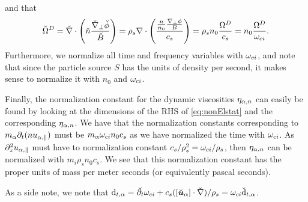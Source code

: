 %
and that
%
\begin{align*}
\breve{\Omega}^D = \breve{\nabla}\cdot\left(\breve{n}\frac{\breve{\nabla}_\perp \breve{\phi}}{\breve{B}}\right)
= \rho_s\nabla\cdot\left(\frac{\frac{n}{n_0}\frac{\nabla_\perp \phi}{B}}{c_s}\right)
= \rho_sn_0\frac{\Omega^D}{c_s}
= n_0\frac{\Omega^D}{\omega_{ci}}.
\end{align*}
%
Furthermore, we normalize all time and frequency variables with $\omega_{ci}$, and note that since the particle source $S$ has the units of density per second, it makes sense to normalize it with $n_0$ and $\omega_{ci}$.

Finally, the normalization constant for the dynamic viscosities $\eta_{\alpha,n}$ can easily be found by looking at the dimensions of the RHS of \cref{eq:nonElstat} and the corresponding $\eta_{\alpha,n}$.
We have that the normalization constants corresponding to $m_\alpha \partial_t(nu_{\alpha,\|})$ must be $m_\alpha\omega_{ci}n_0c_s$ as we have normalized the time with $\omega_{ci}$.
As $\partial_z^2 u_{\alpha,\|}$ must have to normalization constant $c_s/\rho_s^2=\omega_{ci}/\rho_s$, then $\eta_{\alpha,n}$ can be normalized with $m_i\rho_s n_0c_s$.
We see that this normalization constant has the proper units of mass per meter seconds (or equivalently pascal seconds).

As a side note, we note that
$\text{d}_{t,\alpha} = \breve{\partial_t}\omega_{ci} + c_s ([\breve{\boldsymbol{u}}_\alpha]\cdot
    \breve{\nabla})/{\rho_s} = \omega_{ci}\breve{\text{d}}_{t,\alpha}$.

